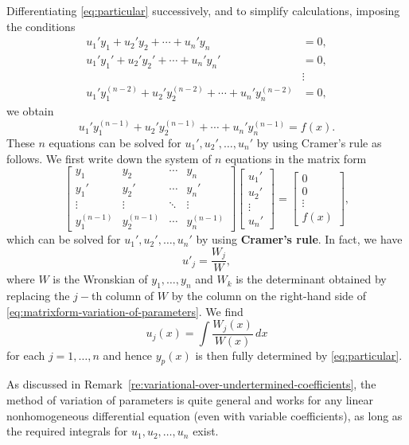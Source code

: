	Differentiating \eqref{eq:particular} successively, and to simplify calculations, imposing the conditions
	\begin{align*}
		u_1'y_1 + u_2'y_2 + \cdots + u_n'y_n &= 0, \\
		u_1'y_1' + u_2'y_2' + \cdots + u_n'y_n' &= 0, \\
		&\vdots \\
		u_1'y_1^{(n-2)} + u_2'y_2^{(n-2)} + \cdots + u_n'y_n^{(n-2)} &= 0,
	\end{align*}
	we obtain
	\[u_1'y_1^{(n-1)} + u_2'y_2^{(n-1)} + \cdots + u_n'y_n^{(n-1)} = f(x).\]
	These \( n \) equations can be solved for \( u_1', u_2', \dots, u_n'\) by using  Cramer's rule as follows.
	We first write down the system  of \( n \) equations  in the matrix form 
	\begin{equation}\label{eq:matrixform-variation-of-parameters}
	\begin{bmatrix}
		y_1 & y_2 & \cdots & y_n \\
		y_1' & y_2' & \cdots & y_n' \\
		\vdots & \vdots & \ddots & \vdots \\
		y_1^{(n-1)} & y_2^{(n-1)} & \cdots & y_n^{(n-1)}
	\end{bmatrix}
	\begin{bmatrix}
		u_1' \\
		u_2' \\
		\vdots \\
		u_n'
	\end{bmatrix}
	=
	\begin{bmatrix}
		0 \\
		0 \\
		\vdots \\
		f(x)
	\end{bmatrix},
	\end{equation}
which  can  be solved for \( u_1', u_2', \dots, u_n'\) by using   \textbf{Cramer's rule}. In fact, we have
\[u'_j= \frac{W_j}{W},\] where $W$ is the Wronskian of $y_1, \dots, y_n$ and $W_k$ is the determinant obtained by replacing the $j-$th column of $W$ by the column on the right-hand side of \eqref{eq:matrixform-variation-of-parameters}. We  find \[u_j(x) =\int \frac{W_j(x)}{W(x)}\, dx \] for  each \( j = 1, \dots, n\)   and hence $y_p(x)$ is then fully determined by \eqref{eq:particular}.


	As discussed in Remark~\ref{re:variational-over-undertermined-coefficients},  the method of variation of parameters is quite general and works for any linear nonhomogeneous differential equation (even with variable coefficients), as long as the required integrals for \( u_1, u_2, \dots, u_n \) exist.
	
